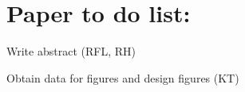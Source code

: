 \section*{Paper to do list:}

\begin{todolist}
    
    \item Write abstract (RFL, RH)
    \item Obtain data for figures and design figures (KT)
    
    

\end{todolist}


